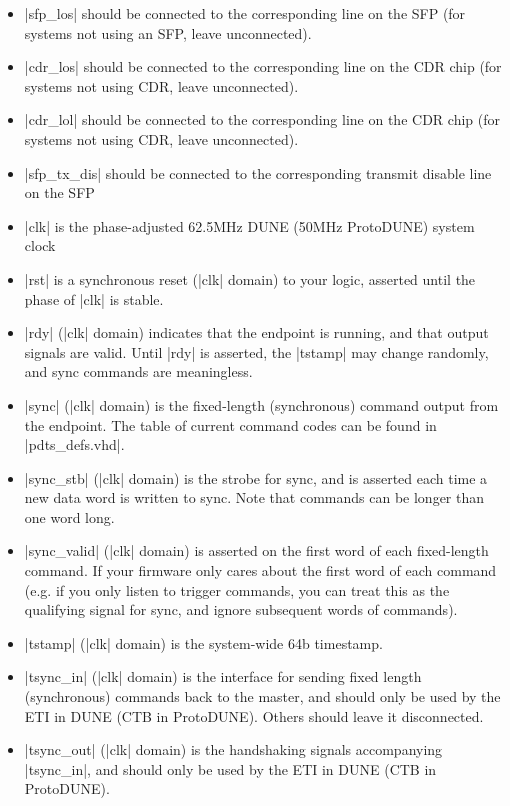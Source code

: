 \documentclass{dune}
\begin{document}
\begin{itemize}
\item |sfp_los| should be connected to the corresponding line on the SFP (for systems
not using an SFP, leave unconnected).

\item |cdr_los| should be connected to the corresponding line on the CDR chip (for systems not using
CDR, leave unconnected).

\item |cdr_lol| should be connected to the corresponding line on the CDR chip (for systems not using
CDR, leave unconnected).

\item |sfp_tx_dis| should be connected to the corresponding transmit disable line on the SFP

\item |clk| is the phase-adjusted 62.5MHz DUNE (50MHz ProtoDUNE) system clock

\item |rst| is a synchronous reset (|clk| domain) to your logic, asserted until the phase of |clk|
is stable.

\item |rdy| (|clk| domain) indicates that the endpoint is running, and that output signals are
valid. Until |rdy| is asserted, the |tstamp| may change randomly, and sync commands are
meaningless.

\item |sync| (|clk| domain) is the fixed-length (synchronous) command output from the endpoint. The table of current
command codes can be found in |pdts_defs.vhd|.

\item |sync_stb| (|clk| domain) is the strobe for sync, and is asserted each time a new data word is
written to sync. Note that commands can be longer than one word long.

\item |sync_valid| (|clk| domain) is asserted on the first word of each fixed-length command. If your firmware only
cares about the first word of each command (e.g. if you only listen to trigger
commands, you can treat this as the qualifying signal for sync, and ignore
subsequent words of commands).

\item |tstamp| (|clk| domain) is the system-wide 64b timestamp.

\item |tsync_in| (|clk| domain) is the interface for sending fixed length (synchronous) commands back to the master, and should
only be used by the ETI in DUNE (CTB in ProtoDUNE). Others should leave it disconnected.

\item |tsync_out| (|clk| domain) is the handshaking signals accompanying |tsync_in|, and should
only be used by the ETI in DUNE (CTB in ProtoDUNE).

\end{itemize}
\end{document}
